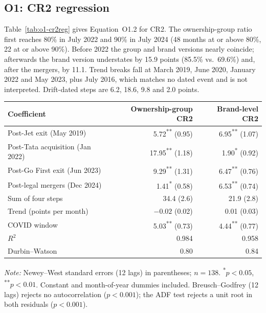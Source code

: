 \documentclass[12pt,a4paper]{article}
\newif\ifoneon
\newcommand{\oneHL}{\par\oneontrue\color{orange}\captionsetup{font+={color=blue}}}
\begin{document}
{\begin{minipage}{\linewidth}
\end{minipage}
\par}

\clearpage
{\oneHL \subsection{O1: CR2 regression}
\label{app:o1-cr2}
Table~\ref{tab:o1-cr2reg} gives Equation~O1.2 for CR2. The ownership-group ratio first reaches 80\% in July 2022 and 90\% in July 2024 (48 months at or above 80\%, 22 at or above 90\%). Before 2022 the group and brand versions nearly coincide; afterwards the brand version understates by 15.9 points (85.5\% vs.\ 69.6\%) and, after the mergers, by 11.1. Trend breaks fall at March 2019, June 2020, January 2022 and May 2023, plus July 2016, which matches no dated event and is not interpreted. Drift-dated steps are 6.2, 18.6, 9.8 and 2.0 points.

\begin{minipage}{\linewidth}
\label{tab:o1-cr2reg}
\centering
{\small{}\setlength{\tabcolsep}{5pt}
\begin{tabular}{@{}lrr@{}}
\toprule
Coefficient & Ownership-group CR2 & Brand-level CR2 \\
\midrule
Post-Jet exit (May 2019) & 5.72\textsuperscript{**} (0.95) & 6.95\textsuperscript{**} (1.07) \\
Post-Tata acquisition (Jan 2022) & 17.95\textsuperscript{**} (1.18) & 1.90\textsuperscript{*} (0.92) \\
Post-Go First exit (Jun 2023) & 9.29\textsuperscript{**} (1.31) & 6.47\textsuperscript{**} (0.76) \\
Post-legal mergers (Dec 2024) & 1.41\textsuperscript{*} (0.58) & 6.53\textsuperscript{**} (0.74) \\
Sum of four steps & 34.4 (2.6) & 21.9 (2.8) \\
Trend (points per month) & $-0.02$ (0.02) & 0.01 (0.03) \\
COVID window & 5.03\textsuperscript{**} (0.73) & 4.44\textsuperscript{**} (0.77) \\
\midrule
$R^2$ & 0.984 & 0.958 \\
Durbin--Watson & 0.80 & 0.84 \\
\bottomrule
\end{tabular}\par}
\vspace{4pt}
{\footnotesize{}\raggedright\textit{Note:} Newey--West standard errors (12 lags) in parentheses; $n=138$. \textsuperscript{*}$p<0.05$, \textsuperscript{**}$p<0.01$. Constant and month-of-year dummies included. Breusch--Godfrey (12 lags) rejects no autocorrelation ($p<0.001$); the ADF test rejects a unit root in both residuals ($p<0.001$).\par}
\end{minipage}

\vspace{1.2em}
\par}
\end{document}
